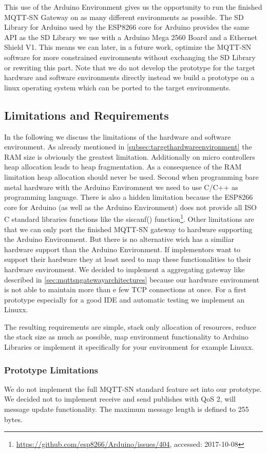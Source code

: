 This use of the Arduino Environment gives us the opportunity to run the finished MQTT-SN Gateway on as many different environments as possible.
The SD Library for Arduino used by the ESP8266 core for Arduino provides the same API as the SD Library we use with a Arduino Mega 2560 Board and a Ethernet Shield V1.
This means we can later, in a future work, optimize the MQTT-SN software for more constrained enviromnents without exchanging the SD Library or rewriting this part.
Note that we do not develop the prototype for the target hardware and software environments directly instead we build a prototype on a linux operating system which can be ported to the target environments.
\subsection{Limitations and Requirements}\label{sec:limitationsandrequirements}
In the following we discuss the limitations of the hardware and software environment.
As already mentioned in \autoref{subsec:targethardwareenvironment} the RAM size is obviously the greatest limitation.
Additionally on micro controllers heap allocation leads to heap fragmentation.
As a consequence of the RAM limitation heap allocation should never be used.
Second when programming bare metal hardware with the Arduino Enviromnent we need to use C/C++ as programming language.
There is also a hidden limitation because the ESP8266 core for Arduino (as well as the Arduino Environment) does not provide all ISO C standard libraries functions like the siscanf() function\footnote{\url{https://github.com/esp8266/Arduino/issues/404}, accessed: 2017-10-08}.
Other limitations are that we can only port the finished MQTT-SN gateway to hardware supporting the Arduino Environment.
But there is no alternative wich has a similiar hardware support than the Arduino Environment.
If implementors want to support their hardware they at least need to map these functionalities to their hardware environment.
We decided to implement a aggregating gateway like described in \autoref{sec:mqttsngatewayarchitectures} because our hardware environment is not able to maintain more than e few TCP connections at once.
For a first prototype especially for a good IDE and automatic testing we implement an Linuxx.

The resulting requirements are simple, stack only allocation of resources, reduce the stack size as much as possible, map environment functionality to Arduino Libraries or implement it specifically for your environment for example Linuxx.

\subsubsection{Prototype Limitations}
We do not implement the full MQTT-SN standard feature set into our prototype.
We decided not to implement receive and send publishes with QoS 2, will message update functionality.
The maximum message length is defined to 255 bytes.
